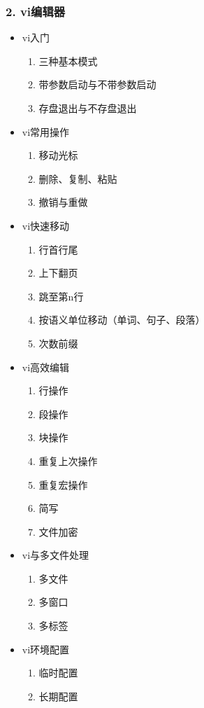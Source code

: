 \documentclass[bigger]{beamer}
\begin{document}
\begin{frame}
\frametitle{2. vi编辑器}
\label{sec-2-2}

\begin{itemize}
\item vi入门
\begin{enumerate}
\item 三种基本模式
\item 带参数启动与不带参数启动
\item 存盘退出与不存盘退出
\end{enumerate}
\item vi常用操作
\begin{enumerate}
\item 移动光标
\item 删除、复制、粘贴
\item 撤销与重做
\end{enumerate}
\item vi快速移动
\begin{enumerate}
\item 行首行尾
\item 上下翻页
\item 跳至第n行
\item 按语义单位移动（单词、句子、段落）
\item 次数前缀
\end{enumerate}
\item vi高效编辑
\begin{enumerate}
\item 行操作
\item 段操作
\item 块操作
\item 重复上次操作
\item 重复宏操作
\item 简写
\item 文件加密
\end{enumerate}
\item vi与多文件处理
\begin{enumerate}
\item 多文件
\item 多窗口
\item 多标签
\end{enumerate}
\item vi环境配置
\begin{enumerate}
\item 临时配置
\item 长期配置
\end{enumerate}
\end{itemize}
\end{frame}
\end{document}
